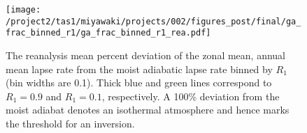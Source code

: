 \documentclass{ametsocV5}
\begin{document}
%

%

\begin{figure}
  \noindent\texttt{[image: /project2/tas1/miyawaki/projects/002/figures\_post/final/ga\_frac\_binned\_r1/ga\_frac\_binned\_r1\_rea.pdf]}\\
  \caption{The reanalysis mean percent deviation of the zonal mean, annual mean lapse rate from the moist adiabatic lapse rate binned by $R_{1}$ (bin widths are 0.1). Thick blue and green lines correspond to $R_1=0.9$ and $R_1=0.1$, respectively. A 100\% deviation from the moist adiabat denotes an isothermal atmosphere and hence marks the threshold for an inversion.}
  \label{fig:rea-binned-r1}
\end{figure}
\end{document}
